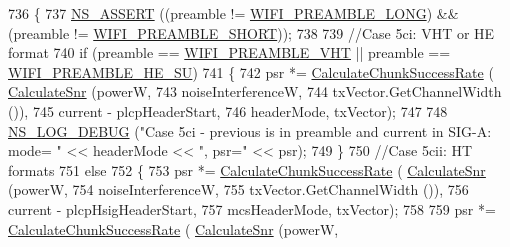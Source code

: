 \begin{DoxyCode}
736             \{
737               \hyperlink{assert_8h_a6dccdb0de9b252f60088ce281c49d052}{NS\_ASSERT} ((preamble != \hyperlink{group__wifi_gga5e94a56cb338a14ffbbb19c6a41251eba12f3d9468d1630bd38bbef20df1e3eda}{WIFI\_PREAMBLE\_LONG}) && (preamble != 
      \hyperlink{group__wifi_gga5e94a56cb338a14ffbbb19c6a41251ebab9a39ca1f62d36c33ac489c4cf59745b}{WIFI\_PREAMBLE\_SHORT}));
738 
739               \textcolor{comment}{//Case 5ci: VHT or HE format}
740               \textcolor{keywordflow}{if} (preamble == \hyperlink{group__wifi_gga5e94a56cb338a14ffbbb19c6a41251ebab90b0fe0b17f27e51c0fe16239e7b089}{WIFI\_PREAMBLE\_VHT} || preamble == 
      \hyperlink{group__wifi_gga5e94a56cb338a14ffbbb19c6a41251eba99c3e12c6e91fc9a9bee491d20dab807}{WIFI\_PREAMBLE\_HE\_SU})
741                 \{
742                   psr *= \hyperlink{classns3_1_1InterferenceHelper_ab1c34c3f7ecef1e37ec778c0cf0e9cef}{CalculateChunkSuccessRate} (
      \hyperlink{classns3_1_1InterferenceHelper_a8f6192d041874595004c007c5a519b4b}{CalculateSnr} (powerW,
743                                                                   noiseInterferenceW,
744                                                                   txVector.GetChannelWidth ()),
745                                                     current - plcpHeaderStart,
746                                                     headerMode, txVector);
747 
748                   \hyperlink{group__logging_ga413f1886406d49f59a6a0a89b77b4d0a}{NS\_LOG\_DEBUG} (\textcolor{stringliteral}{"Case 5ci - previous is in preamble and current in SIG-A: mode=
      "} << headerMode << \textcolor{stringliteral}{", psr="} << psr);
749                 \}
750               \textcolor{comment}{//Case 5cii: HT formats}
751               \textcolor{keywordflow}{else}
752                 \{
753                   psr *= \hyperlink{classns3_1_1InterferenceHelper_ab1c34c3f7ecef1e37ec778c0cf0e9cef}{CalculateChunkSuccessRate} (
      \hyperlink{classns3_1_1InterferenceHelper_a8f6192d041874595004c007c5a519b4b}{CalculateSnr} (powerW,
754                                                                   noiseInterferenceW,
755                                                                   txVector.GetChannelWidth ()),
756                                                     current - plcpHsigHeaderStart,
757                                                     mcsHeaderMode, txVector);
758 
759                   psr *= \hyperlink{classns3_1_1InterferenceHelper_ab1c34c3f7ecef1e37ec778c0cf0e9cef}{CalculateChunkSuccessRate} (
      \hyperlink{classns3_1_1InterferenceHelper_a8f6192d041874595004c007c5a519b4b}{CalculateSnr} (powerW,

\end{DoxyCode}
